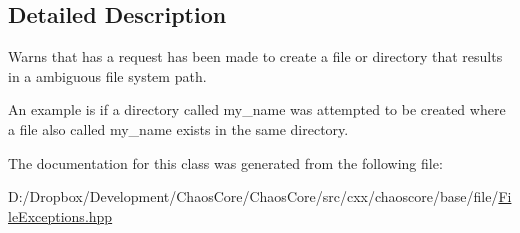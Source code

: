 \subsection{Detailed Description}
Warns that has a request has been made to create a file or directory that results in a ambiguous file system path. 

An example is if a directory called \textquotesingle{}my\+\_\+name\textquotesingle{} was attempted to be created where a file also called \textquotesingle{}my\+\_\+name\textquotesingle{} exists in the same directory. 

The documentation for this class was generated from the following file\+:\begin{DoxyCompactItemize}
\item 
D\+:/\+Dropbox/\+Development/\+Chaos\+Core/\+Chaos\+Core/src/cxx/chaoscore/base/file/\hyperlink{_file_exceptions_8hpp}{File\+Exceptions.\+hpp}\end{DoxyCompactItemize}
